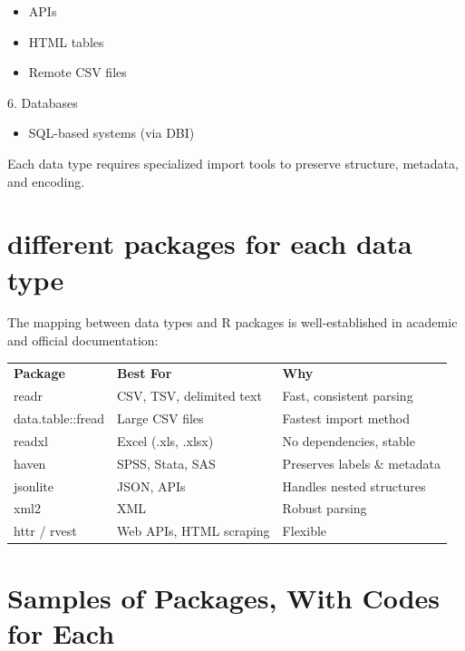 \documentclass[
  doc,
  longtable,
  a4paper,
  nolmodern,
  notxfonts,
  notimes,
  colorlinks=true,linkcolor=blue,citecolor=blue,urlcolor=blue]{apa7}
\providecommand{\tightlist}{%
  \setlength{\itemsep}{0pt}\setlength{\parskip}{0pt}}
\newcounter{none} %
\begin{document}
\begin{itemize}
\tightlist
\item
  APIs\\
\item
  HTML tables\\
\item
  Remote CSV files
\end{itemize}

6. Databases

\begin{itemize}
\tightlist
\item
  SQL-based systems (via DBI)
\end{itemize}

Each data type requires specialized import tools to preserve structure,
metadata, and encoding.

\section{different packages for each data
type}\label{different-packages-for-each-data-type}

The mapping between data types and R packages is well-established in
academic and official documentation:

{\def\LTcaptype{none} %
\begin{longtable}[]{@{}
  >{\raggedright\arraybackslash}p{}
  >{\raggedright\arraybackslash}p{}
  >{\raggedright\arraybackslash}p{}@{}}
\toprule\noalign{}
\endhead
\bottomrule\noalign{}
\endlastfoot
\textbf{Package} & \textbf{Best For} & \textbf{Why} \\
readr & CSV, TSV, delimited text & Fast, consistent parsing \\
data.table::fread & Large CSV files & Fastest import method \\
readxl & Excel (.xls, .xlsx) & No dependencies, stable \\
haven & SPSS, Stata, SAS & Preserves labels \& metadata \\
jsonlite & JSON, APIs & Handles nested structures \\
xml2 & XML & Robust parsing \\
httr / rvest & Web APIs, HTML scraping & Flexible \\
\end{longtable}
}

\section{Samples of Packages, With Codes for
Each}\label{samples-of-packages-with-codes-for-each}
\end{document}

